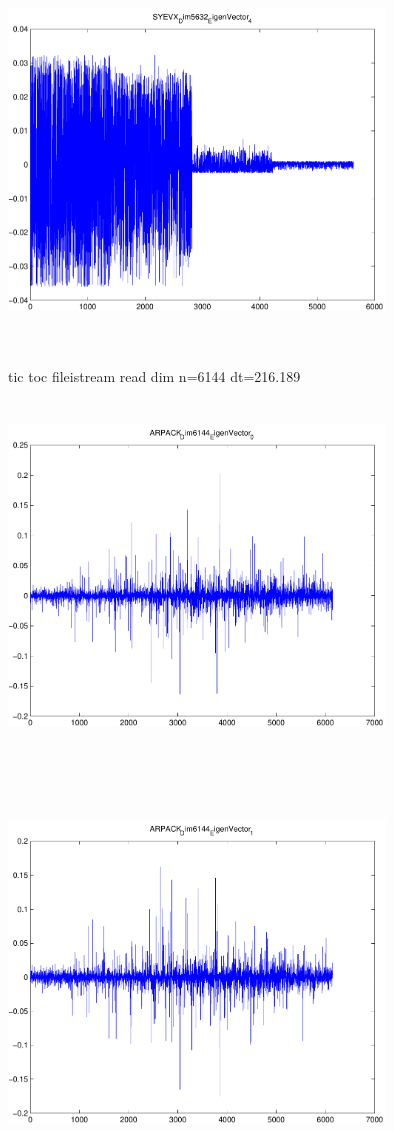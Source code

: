 \documentclass[9pt]{article}
\theoremstyle{plain}
\theoremstyle{definition}
\theoremstyle{remark}
\numberwithin{equation}{section}
\begin{document}
\includegraphics[width=10.0cm,height=10.0cm]{SYEVX_Dim5632_EigenVector_4.pdf}

tic toc fileistream read dim n=6144 dt=216.189
\includegraphics[width=10.0cm,height=10.0cm]{ARPACK_Dim6144_EigenVector_0.pdf}

\includegraphics[width=10.0cm,height=10.0cm]{ARPACK_Dim6144_EigenVector_1.pdf}
\end{document}
